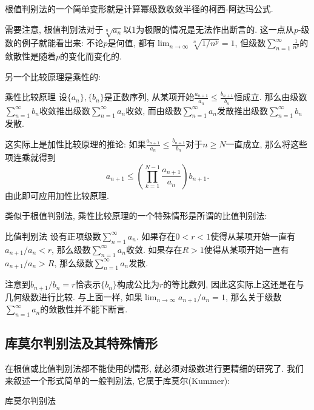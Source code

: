 根值判别法的一个简单变形就是计算幂级数收敛半径的柯西-阿达玛公式.

需要注意, 根值判别法对于$\sqrt[n]{a_n}$以1为极限的情况是无法作出断言的. 这一点从$p$-级数的例子就能看出来: 不论$p$是何值, 都有$\lim_{n\to\infty}\sqrt[n]{1/n^p}=1$, 但级数$\sum_{n=1}^\infty\frac{1}{n^p}$的敛散性是随着$p$的变化而变化的.

另一个比较原理是乘性的:
\begin{theorem}{乘性比较原理}
设$\{a_n\},\{b_n\}$是正数序列, 从某项开始$\frac{a_{n+1}}{a_n}\leq \frac{b_{n+1}}{b_n}$恒成立. 那么由级数$\sum_{n=1}^\infty b_n$收敛推出级数$\sum_{n=1}^\infty a_n$收敛, 而由级数$\sum_{n=1}^\infty a_n$发散推出级数$\sum_{n=1}^\infty b_n$发散.
\end{theorem}
这实际上是加性比较原理的推论: 如果$\frac{a_{n+1}}{a_n}\leq \frac{b_{n+1}}{b_n}$对于$n\geq N$一直成立, 那么将这些项连乘就得到
$$
a_{n+1}\leq \left(\prod_{k=1}^{N-1}\frac{a_{n+1}}{a_n}\right)b_{n+1}.
$$
由此即可应用加性比较原理.

类似于根值判别法, 乘性比较原理的一个特殊情形是所谓的比值判别法:
\begin{theorem}{比值判别法}
设有正项级数$\sum_{n=1}^\infty a_n$. 如果存在$0<r<1$使得从某项开始一直有$a_{n+1}/a_n<r$, 那么级数$\sum_{n=1}^\infty a_n$收敛. 如果存在$R>1$使得从某项开始一直有$a_{n+1}/{a_n}>R$, 那么级数$\sum_{n=1}^\infty a_n$发散.
\end{theorem}
注意到$b_{n+1}/b_n=r$恰表示$\{b_n\}$构成公比为$r$的等比数列, 因此这实际上这还是在与几何级数进行比较. 与上面一样, 如果$\lim_{n\to\infty}a_{n+1}/a_n=1$, 那么关于级数$\sum_{n=1}^\infty a_n$的敛散性并不能下断言.

\subsection{库莫尔判别法及其特殊情形}
在根值或比值判别法都不能使用的情形, 就必须对级数进行更精细的研究了. 我们来叙述一个形式简单的一般判别法, 它属于库莫尔(Kummer):

\begin{theorem}{库莫尔判别法}

\end{theorem}